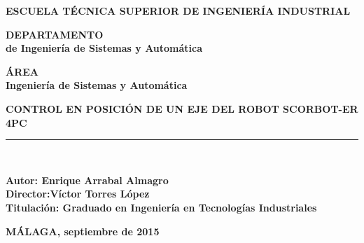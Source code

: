 \begin{center}
	\begin{large}
		\textbf {ESCUELA TÉCNICA SUPERIOR DE INGENIERÍA INDUSTRIAL\\}		
	\end{large}	
	\vspace*{0.5cm}
	\begin{large}
		\textbf {DEPARTAMENTO\\ de Ingeniería de Sistemas y Automática\\}		
	\end{large}	
	\vspace*{1cm}
	\begin{large}
		\textbf {ÁREA\\Ingeniería de Sistemas y Automática\\}		
	\end{large}	
	\vspace*{1cm}	
	\begin{LARGE}	
		\textbf {CONTROL EN POSICIÓN DE UN EJE DEL ROBOT SCORBOT-ER 4PC\\}
	\end{LARGE}
	\vspace*{0.3cm}
	\rule{5cm}{0.01cm}\\
	\vspace*{1cm}
	\begin{large}
		\textbf {Autor: Enrique Arrabal Almagro\\}
		\vspace*{0.5cm}
		\textbf {Director:Víctor Torres López\\}
		\vspace*{1cm}
		\textbf{Titulación: Graduado en Ingeniería en Tecnologías Industriales}
	\end{large}	
	\vspace*{3cm}
\begin{center}
\bf{MÁLAGA, septiembre de 2015}
\end{center}					
\end{center}
\thispagestyle{empty}

